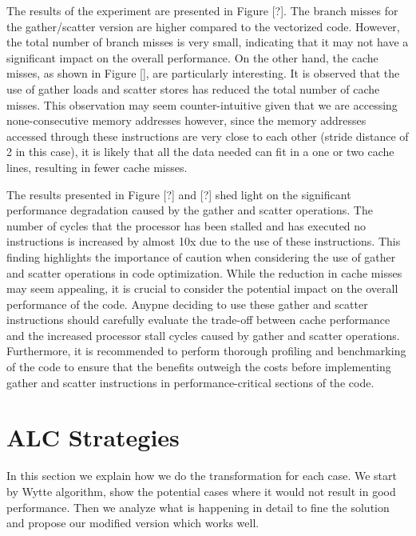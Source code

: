 \documentclass[\main/thesis.tex]{subfiles}
\begin{document}
The results of the experiment are presented in Figure [?]. The branch misses for the gather/scatter version are higher compared to the vectorized code. However, the total number of branch misses is very small, indicating that it may not have a significant impact on the overall performance. On the other hand, the cache misses, as shown in Figure [], are particularly interesting. It is observed that the use of gather loads and scatter stores has reduced the total number of cache misses. This observation may seem counter-intuitive given that we are accessing none-consecutive memory addresses however, since the memory addresses accessed through these instructions are very close to each other (stride distance of 2 in this case), it is likely that all the data needed can fit in a one or two cache lines, resulting in fewer cache misses.

The results presented in Figure [?] and [?] shed light on the significant performance degradation caused by the gather and scatter operations. The number of cycles that the processor has been stalled and has executed no instructions is increased by almost 10x due to the use of these instructions. This finding highlights the importance of caution when considering the use of gather and scatter operations in code optimization. While the reduction in cache misses may seem appealing, it is crucial to consider the potential impact on the overall performance of the code. Anypne deciding to use these gather and scatter instructions should carefully evaluate the trade-off between cache performance and the increased processor stall cycles caused by gather and scatter operations. Furthermore, it is recommended to perform thorough profiling and benchmarking of the code to ensure that the benefits outweigh the costs before implementing gather and scatter instructions in performance-critical sections of the code.








\section{ALC Strategies}

In this section we explain how we do the transformation for each case. We start by Wytte algorithm, show the potential cases where it would not result in good performance. Then we analyze what is happening in detail to fine the solution and propose our modified version which works well.
\end{document}

